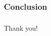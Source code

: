 \documentclass[hyperref={bookmarks=false},aspectratio=169]{beamer}
\begin{document}
\begin{frame}
  \frametitle{Conclusion}

\end{frame}


\begin{frame}
  \frametitle{}
  Thank you!
\end{frame}














\end{document}
